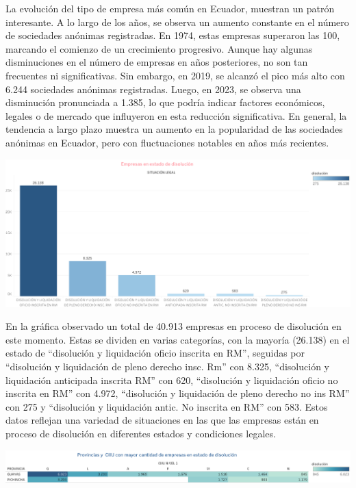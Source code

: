 \documentclass[
]{article}
\begin{document}
La evolución del tipo de empresa más común en Ecuador, muestran un
patrón interesante. A lo largo de los años, se observa un aumento
constante en el número de sociedades anónimas registradas. En 1974,
estas empresas superaron las 100, marcando el comienzo de un crecimiento
progresivo. Aunque hay algunas disminuciones en el número de empresas en
años posteriores, no son tan frecuentes ni significativas. Sin embargo,
en 2019, se alcanzó el pico más alto con 6.244 sociedades anónimas
registradas. Luego, en 2023, se observa una disminución pronunciada a
1.385, lo que podría indicar factores económicos, legales o de mercado
que influyeron en esta reducción significativa. En general, la tendencia
a largo plazo muestra un aumento en la popularidad de las sociedades
anónimas en Ecuador, pero con fluctuaciones notables en años más
recientes.

\includegraphics{imagenes/Hoja 10.png}

En la gráfica observado un total de 40.913 empresas en proceso de
disolución en este momento. Estas se dividen en varias categorías, con
la mayoría (26.138) en el estado de ``disolución y liquidación oficio
inscrita en RM'', seguidas por ``disolución y liquidación de pleno
derecho insc. Rm'' con 8.325, ``disolución y liquidación anticipada
inscrita RM'' con 620, ``disolución y liquidación oficio no inscrita en
RM'' con 4.972, ``disolución y liquidación de pleno derecho no ins RM''
con 275 y ``disolución y liquidación antic. No inscrita en RM'' con 583.
Estos datos reflejan una variedad de situaciones en las que las empresas
están en proceso de disolución en diferentes estados y condiciones
legales.

\includegraphics{imagenes/Hoja 10 (2).png}
\end{document}
